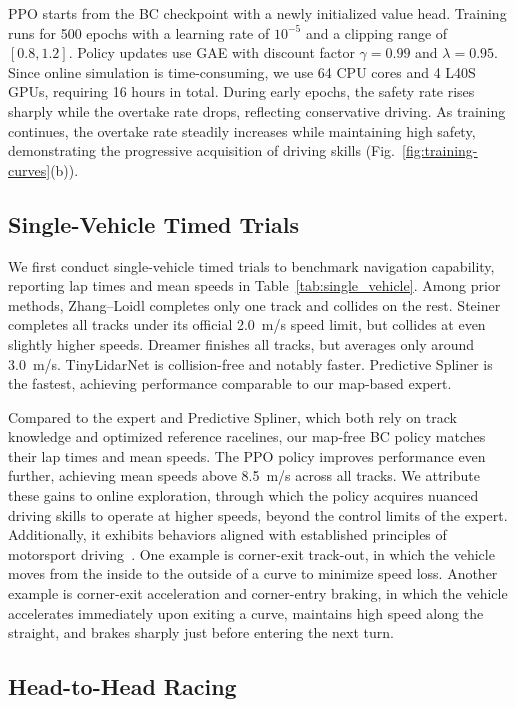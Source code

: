 \documentclass[letterpaper,10 pt,conference]{ieeeconf}
\begin{document}
PPO starts from the BC checkpoint with a newly initialized value head. Training runs for 500 epochs with a learning rate of \(10^{-5}\) and a clipping range of \([0.8, 1.2]\). Policy updates use GAE with discount factor $\gamma = 0.99$ and $\lambda = 0.95$. Since online simulation is time-consuming, we use 64 CPU cores and 4 L40S GPUs, requiring 16 hours in total. During early epochs, the safety rate rises sharply while the overtake rate drops, reflecting conservative driving. As training continues, the overtake rate steadily increases while maintaining high safety, demonstrating the progressive acquisition of driving skills (Fig.~\ref{fig:training-curves}(b)).

\subsection{Single-Vehicle Timed Trials}
\label{sec:single-vehicle-timed-trials}

We first conduct single-vehicle timed trials to benchmark navigation capability, reporting lap times and mean speeds in Table~\ref{tab:single_vehicle}. Among prior methods, Zhang--Loidl completes only one track and collides on the rest. Steiner completes all tracks under its official 2.0~m/s speed limit, but collides at even slightly higher speeds. Dreamer finishes all tracks, but averages only around 3.0~m/s. TinyLidarNet is collision-free and notably faster. Predictive Spliner is the fastest, achieving performance comparable to our map-based expert.

Compared to the expert and Predictive Spliner, which both rely on track knowledge and optimized reference racelines, our map-free BC policy matches their lap times and mean speeds. The PPO policy improves performance even further, achieving mean speeds above 8.5~m/s across all tracks. We attribute these gains to online exploration, through which the policy acquires nuanced driving skills to operate at higher speeds, beyond the control limits of the expert. Additionally, it exhibits behaviors aligned with established principles of motorsport driving~\cite{mitchell2004driving}. One example is corner-exit track-out, in which the vehicle moves from the inside to the outside of a curve to minimize speed loss. Another example is corner-exit acceleration and corner-entry braking, in which the vehicle accelerates immediately upon exiting a curve, maintains high speed along the straight, and brakes sharply just before entering the next turn.

\subsection{Head-to-Head Racing}
\end{document}

